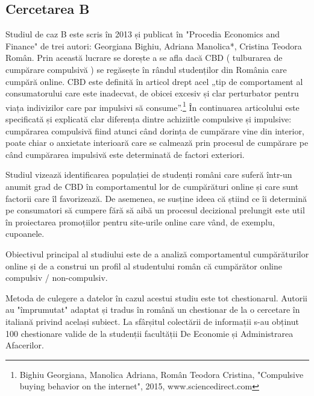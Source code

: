\documentclass[a4paper, 12pt]{article}
\begin{document}
	\subsection {Cercetarea B}
	\qquad\space Studiul de caz B este scris în 2013 și publicat în "Procedia Economics and Finance" de trei autori: Georgiana Bighiu, Adriana Manolica*, Cristina Teodora Român. Prin această lucrare se dorește a se afla dacă CBD ( tulburarea de cumpărare compulsivă ) se regăsește în rândul studenților din România care cumpără online. CBD este definită în articol drept acel „tip de comportament al consumatorului care este inadecvat, de obicei excesiv și clar perturbator pentru viața indivizilor care par impulsivi să consume”.\footnote{Bighiu Georgiana, Manolica Adriana, Român Teodora Cristina, "Compulsive buying behavior on the internet", 2015, www.sciencedirect.com} În continuarea articolului  este specificată și explicată clar diferența dintre achiziitle compulsive și impulsive: cumpărarea compulsivă fiind atunci când dorința de cumpărare vine din interior, poate chiar o anxietate interioară care se calmează prin procesul de cumpărare pe când cumpărarea impulsivă este determinată de factori exteriori.
	
	\quad Studiul vizează identificarea  populației de studenți români care suferă într-un anumit grad de CBD în comportamentul lor de cumpărături online și care sunt factorii care îl favorizează. De asemenea, se susține ideea că știind ce îi determină pe consumatori să cumpere fără să aibă un procesul decizional prelungit este util în proiectarea promoțiilor pentru site-urile online care vând, de exemplu, cupoanele.  
	
	\quad Obiectivul principal al studiului este de a analiză comportamentul cumpărăturilor online și de a construi un profil al studentului român că cumpărător online compulsiv / non-compulsiv.
	
	\quad Metoda de culegere a datelor în cazul acestui studiu este tot chestionarul. Autorii au "împrumutat" adaptat și tradus în română un chestionar de la o cercetare în italiană privind același subiect. La sfârșitul colectării de informații s-au obținut 100 chestionare valide de la studenții facultății De Economie și Administrarea Afacerilor. 
	
\end{document}
